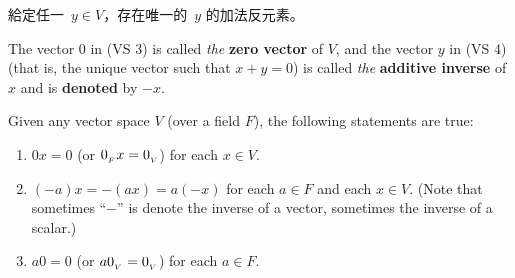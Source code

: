 \begin{note}
給定任一\ \(y \in V\)，存在唯一的\ \(y\) 的加法反元素。
\end{note}

\begin{additional definition} \label{adef 1.5}
The vector \(0\) in  (VS 3) is called \emph{the} \textbf{zero vector} of \(V\), and the vector \(y\) in (VS 4) (that is, the unique vector such that \(x + y = 0\)) is called \emph{the} \textbf{additive inverse} of \(x\) and is \textbf{denoted} by \(-x\).
\end{additional definition}

\begin{theorem} \label{thm 1.2}
Given any vector space \(V\) (over a field \(F\)), the following statements are true:
\begin{enumerate}
    \item \(0x = 0\) (or \(0_{_F} x = 0_{_V}\)) for each \(x \in V\).
    \item \((-a)x = -(ax) = a(-x)\) for each \(a \in F\) and each \(x \in V\). (Note that sometimes ``\(-\)'' is denote the inverse of a vector, sometimes the inverse of a scalar.)
    \item \(a0 = 0\) (or \(a0_{_V} = 0_{_V}\)) for each \(a \in F\).
\end{enumerate}
\end{theorem}

